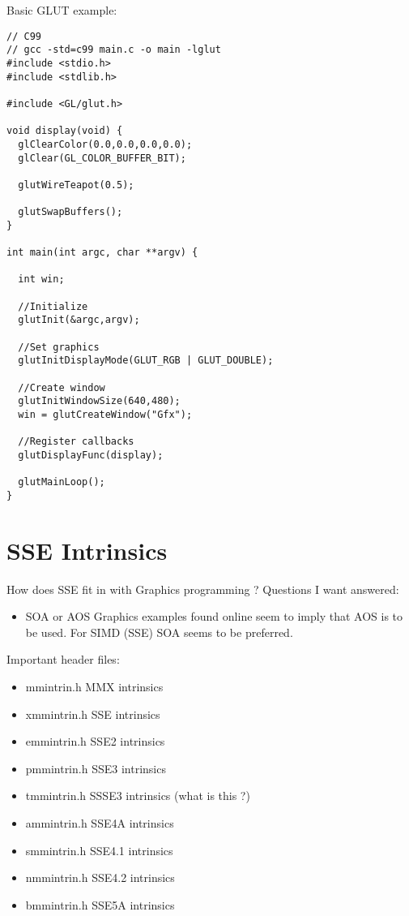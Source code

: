 \documentclass[12pt]{article}
\begin{document}
Basic GLUT example:
\begin{small} 
\begin{verbatim}
// C99 
// gcc -std=c99 main.c -o main -lglut
#include <stdio.h>
#include <stdlib.h>

#include <GL/glut.h> 

void display(void) {
  glClearColor(0.0,0.0,0.0,0.0);
  glClear(GL_COLOR_BUFFER_BIT);

  glutWireTeapot(0.5);

  glutSwapBuffers();
}

int main(int argc, char **argv) {
  
  int win;
  
  //Initialize 
  glutInit(&argc,argv);

  //Set graphics 
  glutInitDisplayMode(GLUT_RGB | GLUT_DOUBLE);

  //Create window 
  glutInitWindowSize(640,480); 
  win = glutCreateWindow("Gfx");

  //Register callbacks
  glutDisplayFunc(display);

  glutMainLoop();
}
\end{verbatim}
\end{small}

\section{SSE Intrinsics}

How does SSE fit in with Graphics programming ? 
Questions I want answered: 
\begin{itemize} 
\item{SOA or AOS} Graphics examples found online seem to imply that 
          AOS is to be used. For SIMD (SSE) SOA seems to be preferred. 
\end{itemize}


Important header files:
\begin{itemize}
\item{mmintrin.h}  MMX intrinsics
\item{xmmintrin.h} SSE intrinsics
\item{emmintrin.h} SSE2 intrinsics
\item{pmmintrin.h} SSE3 intrinsics
\item{tmmintrin.h} SSSE3 intrinsics (what is this ?) 
\item{ammintrin.h} SSE4A intrinsics
\item{smmintrin.h} SSE4.1 intrinsics
\item{nmmintrin.h} SSE4.2 intrinsics
\item{bmmintrin.h} SSE5A intrinsics

\end{itemize} 
\end{document}
